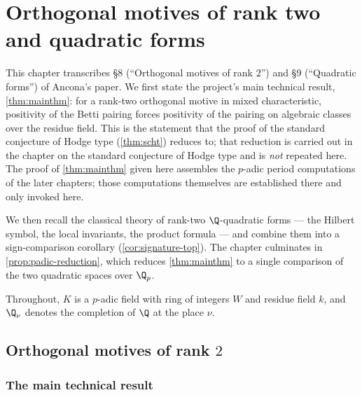 \chapter{Orthogonal motives of rank two and quadratic forms}

This chapter transcribes \S8 (``Orthogonal motives of rank $2$'') and \S9
(``Quadratic forms'') of Ancona's paper. We first state the project's main
technical result, \cref{thm:mainthm}: for a rank-two orthogonal motive in mixed
characteristic, positivity of the Betti pairing forces positivity of the
pairing on algebraic classes over the residue field. This is the statement that
the proof of the standard conjecture of Hodge type (\cref{thm:scht}) reduces to;
that reduction is carried out in the chapter on the standard conjecture of Hodge
type and is \emph{not} repeated here. The proof of \cref{thm:mainthm} given here
assembles the \(p\)-adic period computations of the later chapters; those
computations themselves are established there and only invoked here.

We then recall the classical theory of rank-two \(\Q\)-quadratic forms --- the
Hilbert symbol, the local invariants, the product formula --- and combine them
into a sign-comparison corollary (\cref{cor:signature-top}). The chapter
culminates in \cref{prop:padic-reduction}, which reduces \cref{thm:mainthm} to a
single comparison of the two quadratic spaces over \(\Q_p\).

Throughout, \(K\) is a \(p\)-adic field with ring of integers \(W\) and residue
field \(k\), and \(\Q_\nu\) denotes the completion of \(\Q\) at the place
\(\nu\).

\section{Orthogonal motives of rank $2$}

\subsection*{The main technical result}

